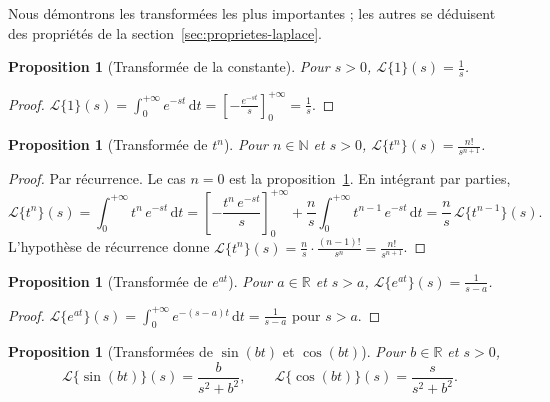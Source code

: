 \documentclass[12pt,a4paper,openany]{book}
\theoremstyle{definition}
\theoremstyle{plain}
\newtheorem{proposition}[definition]{Proposition}
\theoremstyle{remark}
\newcommand{\R}{\mathbb{R}}
\newcommand{\N}{\mathbb{N}}
\newcommand{\dd}{\mathrm{d}}
\begin{document}
Nous démontrons les transformées les plus importantes ; les autres
se déduisent des propriétés de la section~\ref{sec:proprietes-laplace}.

\begin{proposition}[Transformée de la constante]\label{prop:laplace-1}
  Pour $s>0$,
  $\displaystyle\mathcal{L}\{1\}(s)=\frac{1}{s}$.
\end{proposition}

\begin{proof}
  $\displaystyle\mathcal{L}\{1\}(s)
  =\int_0^{+\infty}e^{-st}\,\dd t
  =\left[-\frac{e^{-st}}{s}\right]_0^{+\infty}
  =\frac{1}{s}$.
\end{proof}

\begin{proposition}[Transformée de $t^n$]\label{prop:laplace-tn}
  Pour $n\in\N$ et $s>0$,
  $\displaystyle\mathcal{L}\{t^n\}(s)=\frac{n!}{s^{n+1}}$.
\end{proposition}

\begin{proof}
  Par récurrence. Le cas $n=0$ est la proposition~\ref{prop:laplace-1}.
  En intégrant par parties,
  \[
    \mathcal{L}\{t^n\}(s)
    = \int_0^{+\infty}t^n\,e^{-st}\,\dd t
    = \left[-\frac{t^n\,e^{-st}}{s}\right]_0^{+\infty}
      + \frac{n}{s}\int_0^{+\infty}t^{n-1}\,e^{-st}\,\dd t
    = \frac{n}{s}\,\mathcal{L}\{t^{n-1}\}(s).
  \]
  L'hypothèse de récurrence donne
  $\mathcal{L}\{t^n\}(s)=\frac{n}{s}\cdot\frac{(n-1)!}{s^n}=\frac{n!}{s^{n+1}}$.
\end{proof}

\begin{proposition}[Transformée de $e^{at}$]\label{prop:laplace-eat}
  Pour $a\in\R$ et $s>a$,
  $\displaystyle\mathcal{L}\{e^{at}\}(s)=\frac{1}{s-a}$.
\end{proposition}

\begin{proof}
  $\displaystyle\mathcal{L}\{e^{at}\}(s)
  =\int_0^{+\infty}e^{-(s-a)t}\,\dd t
  =\frac{1}{s-a}$ pour $s>a$.
\end{proof}

\begin{proposition}[Transformées de $\sin(bt)$ et $\cos(bt)$]\label{prop:laplace-sincos}
  Pour $b\in\R$ et $s>0$,
  \[
    \mathcal{L}\{\sin(bt)\}(s)=\frac{b}{s^2+b^2},
    \qquad
    \mathcal{L}\{\cos(bt)\}(s)=\frac{s}{s^2+b^2}.
  \]
\end{proposition}
\end{document}
